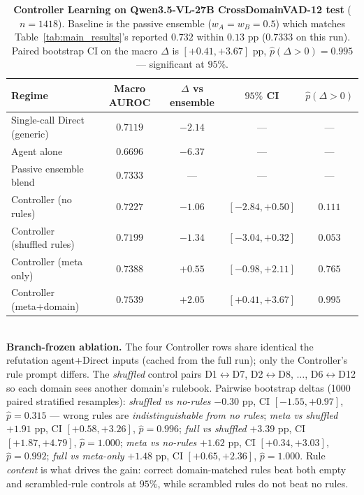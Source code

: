 \begin{table}[t]
\centering
\small
\caption{\textbf{Controller Learning on Qwen3.5-VL-27B
CrossDomainVAD-12 test} ($n{=}1418$). Baseline is the passive ensemble
($w_A = w_B = 0.5$) which matches Table~\ref{tab:main_results}'s
reported $0.732$ within $0.13$ pp ($0.7333$ on this run). Paired
bootstrap CI on the macro $\Delta$ is $[+0.41, +3.67]$ pp,
$\hat p(\Delta{>}0) = 0.995$ --- significant at $95\%$.}
\label{tab:controller_main}
\begin{tabular}{lcccc}
\toprule
Regime & Macro AUROC & $\Delta$ vs ensemble & $95\%$ CI & $\hat p(\Delta{>}0)$\\
\midrule
Single-call Direct (generic)     & $0.7119$ & $-2.14$ & --- & --- \\
Agent alone                   & $0.6696$ & $-6.37$ & --- & --- \\
Passive ensemble blend          & $0.7333$ & ---     & --- & --- \\
Controller (no rules)        & $0.7227$ & $-1.06$ & $[-2.84, +0.50]$ & $0.111$ \\
Controller (shuffled rules)  & $0.7199$ & $-1.34$ & $[-3.04, +0.32]$ & $0.053$ \\
Controller (meta only)       & $0.7388$ & $+0.55$ & $[-0.98, +2.11]$ & $0.765$ \\
Controller (meta+domain)     & $\mathbf{0.7539}$ & $\mathbf{+2.05}$ & $[+0.41, +3.67]$ & $\mathbf{0.995}$ \\
\bottomrule
\end{tabular}
\\[4pt]
{\footnotesize \textbf{Branch-frozen ablation.} The four Controller
rows share identical the refutation agent+Direct inputs (cached from the full run);
only the Controller's rule prompt differs. The \emph{shuffled} control
pairs D1$\leftrightarrow$D7, D2$\leftrightarrow$D8, $\ldots$,
D6$\leftrightarrow$D12 so each domain sees another domain's rulebook.
Pairwise bootstrap deltas (1000 paired stratified resamples):
\emph{shuffled vs no-rules} $-0.30$ pp, CI $[-1.55, +0.97]$,
$\hat p{=}0.315$ --- wrong rules are \emph{indistinguishable from no
rules}; \emph{meta vs shuffled} $+1.91$ pp, CI $[+0.58, +3.26]$,
$\hat p{=}0.996$; \emph{full vs shuffled} $+3.39$ pp, CI $[+1.87,
+4.79]$, $\hat p{=}1.000$; \emph{meta vs no-rules} $+1.62$ pp, CI
$[+0.34, +3.03]$, $\hat p{=}0.992$; \emph{full vs meta-only} $+1.48$
pp, CI $[+0.65, +2.36]$, $\hat p{=}1.000$. Rule \emph{content} is
what drives the gain: correct domain-matched rules beat both empty
and scrambled-rule controls at $95\%$, while scrambled rules do not
beat no rules.}
\end{table}

